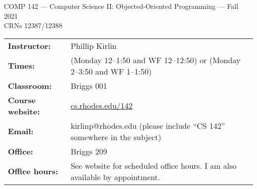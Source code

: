 \documentclass [letterpaper,11pt]{article}
\newcommand{\urlnofont}[1]{\urlstyle{same}\url{#1}}
\begin{document}
\begin{center}
\large COMP 142 --- Computer Science II: Objected-Oriented Programming --- Fall 2021
\\ \normalsize CRNs 12387/12388
\end{center}

\noindent\begin{tabular}{@{}ll}
\textbf{Instructor:} & Phillip Kirlin \\
\textbf{Times:} & (Monday 12--1:50 and WF 12--12:50) or (Monday 2--3:50 and WF 1--1:50) \\
\textbf{Classroom:} & Briggs 001 \\
\textbf{Course website:} & \urlnofont{cs.rhodes.edu/142}\\
\textbf{Email:} &kirlinp@rhodes.edu (please include ``CS 142'' somewhere in the subject)\\
\textbf{Office:} & Briggs 209\\
\textbf{Office hours:} & See website for scheduled office hours.  I am also available by appointment.\\
\end{tabular}
\end{document}
